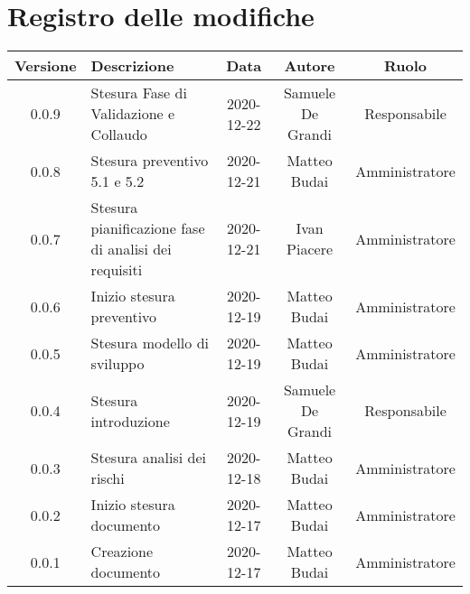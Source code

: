 \section*{Registro delle modifiche}

\begin{center}
	\begin{longtable}{|c|p{5cm}|c|c|c|}
	\hline
	\rowcolor{lighter-grayer}
	\textbf{Versione} & \textbf{Descrizione} & \textbf{Data} & \textbf{Autore} & \textbf{Ruolo} \\
	\hline
	\endfirsthead

	0.0.9 & Stesura Fase di Validazione e Collaudo & 2020-12-22 & Samuele De Grandi & Responsabile \\
	\hline
	0.0.8 & Stesura preventivo 5.1 e 5.2 & 2020-12-21 & Matteo Budai & Amministratore \\
	\hline
	0.0.7 & Stesura pianificazione fase di analisi dei requisiti & 2020-12-21 & Ivan Piacere & Amministratore \\
	\hline
	0.0.6 & Inizio stesura preventivo & 2020-12-19 & Matteo Budai & Amministratore \\
	\hline
	0.0.5 & Stesura modello di sviluppo & 2020-12-19 & Matteo Budai & Amministratore \\
	\hline
	0.0.4 & Stesura introduzione & 2020-12-19 & Samuele De Grandi & Responsabile \\
	\hline
	0.0.3 & Stesura analisi dei rischi & 2020-12-18 & Matteo Budai & Amministratore \\
	\hline
	0.0.2 & Inizio stesura documento & 2020-12-17 & Matteo Budai & Amministratore \\
	\hline
	0.0.1 & Creazione documento & 2020-12-17 & Matteo Budai & Amministratore \\
	\hline

	\end{longtable}
\end{center}